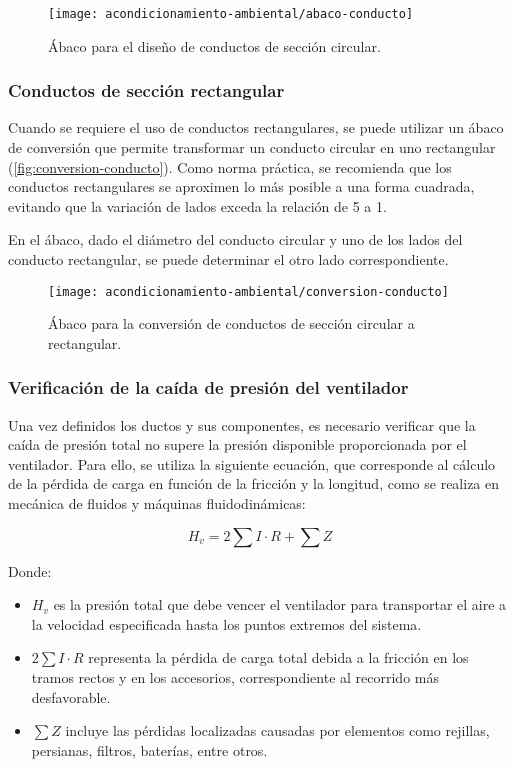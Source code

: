 \begin{figure}
	\centering
	\caption{Ábaco para el diseño de conductos de sección circular.}
	\texttt{[image: acondicionamiento-ambiental/abaco-conducto]}
	\label{fig:diseño-conductos}
\end{figure}

\subsubsection{Conductos de sección rectangular}
Cuando se requiere el uso de conductos rectangulares, se puede utilizar un ábaco de conversión que permite transformar un conducto circular en uno rectangular (\autoref{fig:conversion-conducto}). Como norma práctica, se recomienda que los conductos rectangulares se aproximen lo más posible a una forma cuadrada, evitando que la variación de lados exceda la relación de 5 a 1.

En el ábaco, dado el diámetro del conducto circular y uno de los lados del conducto rectangular, se puede determinar el otro lado correspondiente.

\begin{figure}
	\centering
	\caption{Ábaco para la conversión de conductos de sección circular a rectangular.}
	\texttt{[image: acondicionamiento-ambiental/conversion-conducto]}
	\label{fig:conversion-conducto}
\end{figure}
\subsubsection{Verificación de la caída de presión del ventilador}

Una vez definidos los ductos y sus componentes, es necesario verificar que la caída de presión total no supere la presión disponible proporcionada por el ventilador. Para ello, se utiliza la siguiente ecuación, que corresponde al cálculo de la pérdida de carga en función de la fricción y la longitud, como se realiza en mecánica de fluidos y máquinas fluidodinámicas:

\begin{equation}
	H_v = 2 \sum I \cdot R + \sum Z
\end{equation}

Donde:

\begin{itemize}
	\item $H_v$ es la presión total que debe vencer el ventilador para transportar el aire a la velocidad especificada hasta los puntos extremos del sistema.
	\item $2 \sum I \cdot R$ representa la pérdida de carga total debida a la fricción en los tramos rectos y en los accesorios, correspondiente al recorrido más desfavorable.
	\item $\sum Z$ incluye las pérdidas localizadas causadas por elementos como rejillas, persianas, filtros, baterías, entre otros.
\end{itemize}

